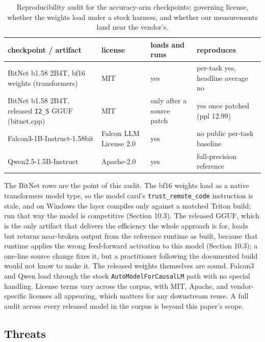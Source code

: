 \documentclass[11pt]{article}
\begin{document}
\begin{table}[htbp]\centering
\caption{Reproducibility audit for the accuracy-arm checkpoints: governing license, whether the weights load under a stock harness, and whether our measurements land near the vendor's.}
\label{tab:repro-audit}
\footnotesize
\begin{tabularx}{\linewidth}{LLLL}\toprule
checkpoint / artifact & license & loads and runs & reproduces \\
\midrule
BitNet b1.58 2B4T, bf16 weights (transformers) & MIT & yes & per-task yes, headline average no \\
BitNet b1.58 2B4T, released \texttt{I2\_S} GGUF (bitnet.cpp) & MIT & only after a source patch & yes once patched (ppl 12.99) \\
Falcon3-1B-Instruct-1.58bit & Falcon LLM License 2.0 & yes & no public per-task baseline \\
Qwen2.5-1.5B-Instruct & Apache-2.0 & yes & full-precision reference \\
\bottomrule\end{tabularx}\end{table}

The BitNet rows are the point of this audit. The bf16 weights load as a native
transformers model type, so the model card's \texttt{trust\_remote\_code} instruction is stale,
and on Windows the layer compiles only against a matched Triton build; run that way the
model is competitive (Section 10.3). The released
GGUF, which is the only artifact that delivers the efficiency the whole approach is for,
loads but returns near-broken output from the reference runtime as built, because that
runtime applies the wrong feed-forward activation to this model (Section 10.3); a
one-line source change fixes it, but a practitioner following the documented build would
not know to make it. The released weights themselves are sound. Falcon3 and Qwen load
through the stock \texttt{AutoModelForCausalLM} path with no special handling. License terms
vary across the corpus, with MIT, Apache, and vendor-specific licenses all appearing,
which matters for any downstream reuse. A full audit across every released model in the
corpus is beyond this paper's scope.

\subsection{Threats}
\end{document}
